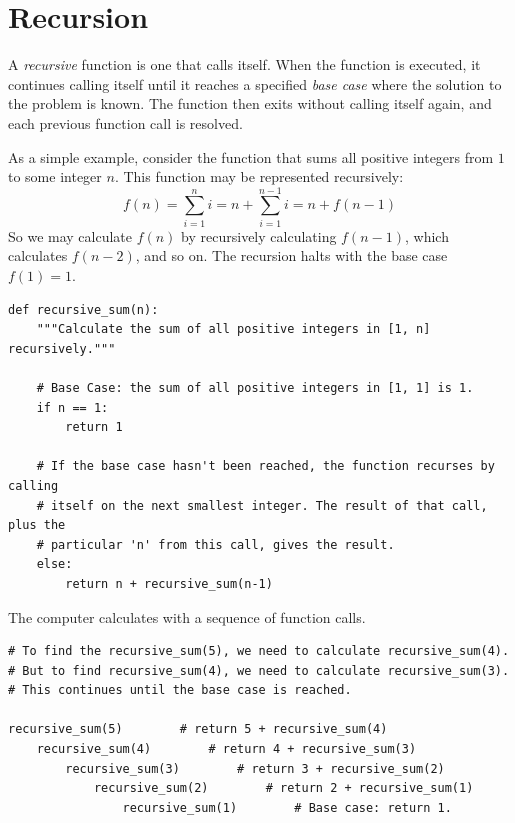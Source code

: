 \label{lab:Python_DataStructures2}


\section*{Recursion}

A \emph{recursive} function is one that calls itself.
When the function is executed, it continues calling itself until it reaches a specified \emph{base case} where the solution to the problem is known.
The function then exits without calling itself again, and each previous function call is resolved.

As a simple example, consider the function that sums all positive integers from $1$ to some integer $n$.
This function may be represented recursively:
\[f(n) = \sum_{i=1}^ni = n + \sum_{i=1}^{n-1}i = n + f(n-1)\]
So we may calculate $f(n)$ by recursively calculating $f(n-1)$, which calculates $f(n-2)$, and so on.
The recursion halts with the base case $f(1) = 1$.

\begin{lstlisting}
def recursive_sum(n):
	"""Calculate the sum of all positive integers in [1, n] recursively."""

	# Base Case: the sum of all positive integers in [1, 1] is 1.
	if n == 1:
		return 1

	# If the base case hasn't been reached, the function recurses by calling
    # itself on the next smallest integer. The result of that call, plus the
    # particular 'n' from this call, gives the result.
	else:
		return n + recursive_sum(n-1)
\end{lstlisting}

The computer calculates  with a sequence of function calls.

\begin{lstlisting}
# To find the recursive_sum(5), we need to calculate recursive_sum(4).
# But to find recursive_sum(4), we need to calculate recursive_sum(3).
# This continues until the base case is reached.

recursive_sum(5)		# return 5 + recursive_sum(4)
	recursive_sum(4)		# return 4 + recursive_sum(3)
		recursive_sum(3)		# return 3 + recursive_sum(2)
			recursive_sum(2)		# return 2 + recursive_sum(1)
				recursive_sum(1)		# Base case: return 1.
\end{lstlisting}

